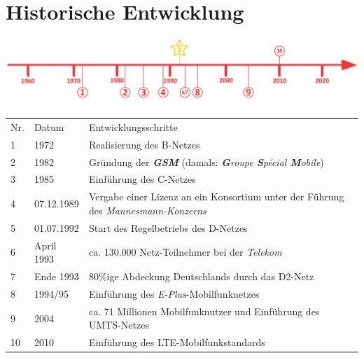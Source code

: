 \section*{Historische Entwicklung}
\includegraphics[width=\textwidth]{Kapitel/DNetz/Grafiken/zeitstrahl.png}
\par
\noindent
{}
\begin{tabular}{p{0.5 cm}p{1.5 cm}p{15.55 cm}}
	Nr. & Datum & Entwicklungsschritte ~\cite{c-netz.7} \\
	1 & 1972 & Realisierung des B-Netzes \\
	2 & 1982 & Gründung der \textit{\textbf{GSM}} (damals: \textit{\textbf{G}roupe \textbf{S}pécial \textbf{M}obile})\\
	3 & 1985 & Einführung des C-Netzes \\
	4 & 07.12.1989 & Vergabe einer Lizenz an ein Konsortium unter der Führung des \textit{Mannesmann-Konzerns} \\
	5 & 01.07.1992 & Start des Regelbetriebs des D-Netzes \\
	6 & April 1993 & ca. 130.000 Netz-Teilnehmer bei der \textit{Telekom} \\
	7 & Ende 1993 & 80\%ige Abdeckung Deutschlands durch das D2-Netz \\
	8 & 1994/95 &  Einführung des \textit{E-Plus}-Mobilfunknetzes \\
	9  & 2004 &  ca. 71 Millionen Mobilfunknutzer und Einführung des UMTS-Netzes \\
	10 & 2010 & Einführung des LTE-Mobilfunkstandards \\
\end{tabular}
\par

